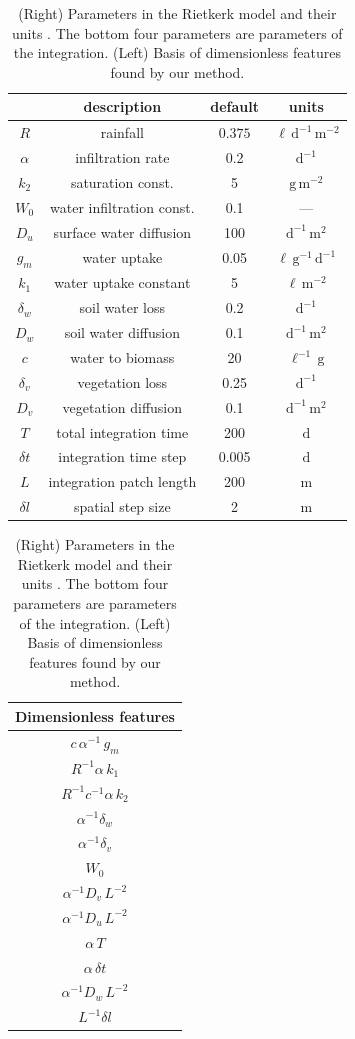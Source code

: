 \documentclass[twoside,11pt]{article}
\newcommand{\unit}[1]{\mathrm{#1}}
\newcommand{\g}{\unit{g}}
\newcommand{\m}{\unit{m}}
\renewcommand{\l}{\unit{\ell}}
\renewcommand{\d}{\unit{d}}
\begin{document}
\begin{table}[t]
    \centering
    \begin{tabular}{ c |c| c |c }
          & description & default & units \\
         \hline
         $R$ & rainfall  & $0.375 $  & $\, \l \, \d^{-1}\, \m^{-2}$\\
         $\alpha$ & infiltration rate & 0.2 & $\d^{-1}$ \\
         $k_2$ & saturation const. & 5 & $\g \, \m^{-2}$ \\
         $W_0$ & water infiltration const. & 0.1 & --- \\
         $D_u$ & surface water diffusion & 100 & $\d^{-1}\, \m^{2}$ \\
         $g_m$ & water uptake & 0.05 & $\l\, \g^{-1}\, \d^{-1}$ \\
         $k_1$ & water uptake constant & 5 & $\l\, \m^{-2}$ \\
         $\delta_w$ & soil water loss & 0.2 & $ \d^{-1}$ \\
         $D_w$ & soil water diffusion & 0.1 & $  \d^{-1}\, \m^2$ \\
         $c$ & water to biomass & 20 & $  \l^{-1}\, \g$ \\
         $\delta_v$ & vegetation loss & 0.25 & $ \d^{-1}$ \\
         $D_v$ & vegetation diffusion & 0.1 & $  \d^{-1}\, \m^2$ \\[2ex]
         $T$ & total integration time & 200 & $  \d$
         \\
        $\delta t$ & integration time step & 0.005 & $  \d$
        \\
        $L$ & integration patch length & 200 & $  \m$
        \\
        $\delta l$ & spatial step size & 2 & $\m$ \\
        \hline
    \end{tabular}
\begin{tabular}{c}
Dimensionless features\\
\hline
$c \, \alpha^{-1}\,g_m$ \\
$ R^{-1} \alpha \, k_1 $\\
$R^{-1}c^{-1} \alpha\, k_2 $ \\
$\alpha^{-1} \delta_w $\\
$\alpha^{-1} \delta_v$ \\
$W_0$ \\
$\alpha^{-1} D_v \, L^{-2}$ \\
$\alpha^{-1}D_u \, L^{-2}$ \\
$ \alpha\, T$ \\
$ \alpha\, \delta t$ \\
$ \alpha^{-1}D_w \, L^{-2} $\\
$ L^{-1}\delta l$ \\
\hline
\end{tabular}
    \caption{(Right) Parameters in the Rietkerk model and their units \citep{rietkerk}. The bottom four parameters are parameters of the integration. (Left) Basis of dimensionless features found by our method.}
    \label{table.params}
\end{table}
\end{document}
